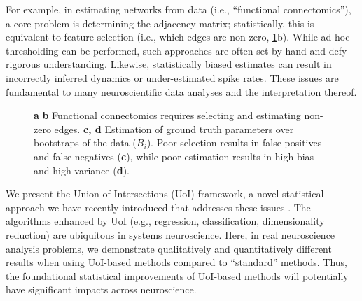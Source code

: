 \documentclass[letterpaper, 10 pt, conference]{ieeeconf}  %
\begin{document}
For example, in estimating networks from data (i.e., ``functional connectomics''), a core problem is determining the adjacency matrix; statistically, this is equivalent to feature selection (i.e., which edges are non-zero, \ref{fig:intro}b). While ad-hoc thresholding can be performed, such approaches are often set by hand and defy rigorous understanding. Likewise, statistically biased estimates can result in incorrectly inferred dynamics or under-estimated spike rates. These issues are fundamental to many neuroscientific data analyses and the interpretation thereof.

\begin{figure}[b!]
    \vspace{-20pt}
    \centering
    \caption{\textbf{a} \textbf{b} Functional connectomics requires selecting and estimating non-zero edges. \textbf{c, d} Estimation of ground truth parameters over bootstraps of the data ($B_i$). Poor selection results in false positives and false negatives (\textbf{c}), while poor estimation results in high bias and high variance (\textbf{d}).}
    \label{fig:intro}
\end{figure}

We present the Union of Intersections (UoI) framework, a novel statistical approach we have recently introduced that addresses these issues \cite{uoi}. The algorithms enhanced by UoI (e.g., regression, classification, dimensionality reduction) are ubiquitous in systems neuroscience. Here, in real neuroscience analysis problems, we demonstrate qualitatively and quantitatively different results when using UoI-based methods compared to ``standard'' methods.  Thus, the foundational statistical improvements of UoI-based methods will potentially have significant impacts across neuroscience.
\end{document}
